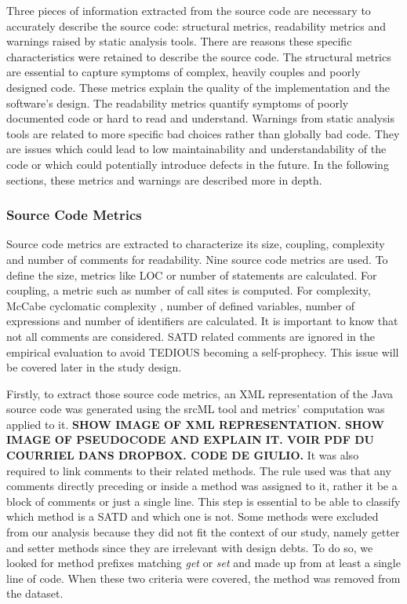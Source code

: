 Three pieces of information extracted from the source code are necessary to accurately describe the source code: structural metrics, readability metrics and warnings raised by static analysis tools. There are reasons these specific characteristics were retained to describe the source code. The structural metrics are essential to capture symptoms of complex, heavily couples and poorly designed code. These metrics explain the quality of the implementation and the software's design. The readability metrics quantify symptoms of poorly documented code or hard to read and understand. Warnings from static analysis tools are related to more specific bad choices rather than globally bad code. They are issues which could lead to low maintainability and understandability of the code or which could potentially introduce defects in the future. In the following sections, these metrics and warnings are described more in depth.

\subsubsection{Source Code Metrics}

Source code metrics are extracted to characterize its size, coupling, complexity and number of comments for readability. Nine source code metrics are used. To define the size, metrics like \ac{LOC} or number of statements are calculated. For coupling, a metric such as number of call sites is computed. For complexity, McCabe cyclomatic complexity \citep{mccabe1990reverse}, number of defined variables, number of expressions and number of identifiers are calculated. It is important to know that not all comments are considered. \ac{SATD} related comments are ignored in the empirical evaluation to avoid \ac{TEDIOUS} becoming a self-prophecy. This issue will be covered later in the study design. \par

Firstly, to extract those source code metrics, an XML representation of the Java source code was generated using the srcML tool \citep{CollardKM03} and metrics' computation was applied to it. \textbf{SHOW IMAGE OF XML REPRESENTATION. SHOW IMAGE OF PSEUDOCODE AND EXPLAIN IT. VOIR PDF DU COURRIEL DANS DROPBOX. CODE DE GIULIO.} It was also required to link comments to their related methods. The rule used was that any comments directly preceding or inside a method was assigned to it, rather it be a block of comments or just a single line. This step is essential to be able to classify which method is a \ac{SATD} and which one is not. Some methods were excluded from our analysis because they did not fit the context of our study, namely getter and setter methods since they are irrelevant with design debts. To do so, we looked for method prefixes matching \emph{get} or \emph{set} and made up from at least a single line of code. When these two criteria were covered, the method was removed from the dataset. \par 

